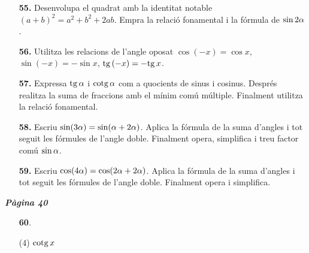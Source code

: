 \documentclass[a4paper, pdf, twoside]{book}
\begin{document}
\begin{multicols}{2}
\begin{enumerate}
\vspace{0.25cm}
\item[\fontfamily{phv}\selectfont\color{blue}\textbf{55. }]  \scalebox{0.6}{\simbolcompass } 
Desenvolupa el quadrat amb la identitat notable $(a+b)^2 = a^2 + b^2 + 2ab$. Empra la relació fonamental i la fórmula de $\sin 2\alpha $.
\vspace{0.25cm}
\item[\fontfamily{phv}\selectfont\color{blue}\textbf{56. }]  \scalebox{0.6}{\simbolcompass } 
Utilitza les relacions de l'angle oposat $\cos (-x)=\cos x$, $\sin (-x)=-\sin x$, $\mathrm{tg}\, (-x)=-\mathrm{tg}\, x$.
\vspace{0.25cm}
\item[\fontfamily{phv}\selectfont\color{blue}\textbf{57. }]  \scalebox{0.6}{\simbolcompass } 
Expressa $\mathrm{tg}\, \alpha $ i $\mathrm{cotg}\, \alpha $ com a quocients de sinus i cosinus. Després realitza la suma de fraccions amb el mínim comú múltiple. Finalment utilitza la relació fonamental.
\vspace{0.25cm}
\item[\fontfamily{phv}\selectfont\color{blue}\textbf{58. }]  \scalebox{0.6}{\simbolcompass } 
Escriu $\sin (3\alpha ) = \sin (\alpha +2\alpha )$. Aplica la fórmula de la suma d'angles i tot seguit les fórmules de l'angle doble. Finalment opera, simplifica i treu factor comú $\sin \alpha $.
\vspace{0.25cm}
\item[\fontfamily{phv}\selectfont\color{blue}\textbf{59. }]  \scalebox{0.6}{\simbolcompass } 
Escriu $\cos (4\alpha ) = \cos (2\alpha +2\alpha )$. Aplica la fórmula de la suma d'angles i tot seguit les fórmules de l'angle doble. Finalment opera i simplifica.
 \end{enumerate}
\vspace{0.3cm}


{\textbf{\em Pàgina 40}} \hrulefill
\begin{enumerate}
\vspace{0.25cm}



 \item[\fontfamily{phv}\selectfont\color{blue}\textbf{60}. ] 
 \begin{tasks}[column-sep=1em, item-indent=1.3333em](4)
	 \task $\mathrm{cotg}\, x$
\end{tasks}
 \end{enumerate}
\begin{enumerate}
\vspace{0.25cm}



\end{enumerate}
\end{multicols}
\end{document}
